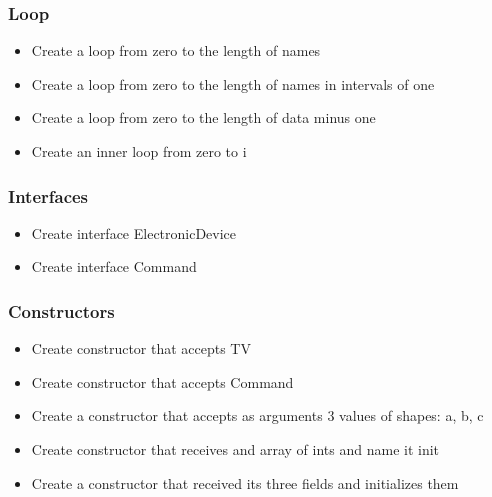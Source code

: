 \subsubsection{Loop}
\begin{itemize}
	\item Create a loop from zero to the length of names
	\item Create a loop from zero to the length of names in intervals of one
	\item Create a loop from zero to the length of data minus one
	\item Create an inner loop from zero to i
\end{itemize}
\subsubsection{Interfaces}
\begin{itemize}
	\item Create interface ElectronicDevice
	\item Create interface Command
\end{itemize}
\subsubsection{Constructors}
\begin{itemize}
	\item Create constructor that accepts TV
	\item Create constructor that accepts Command
	\item Create a constructor that accepts as arguments 3 values of shapes: a, b, c
	\item Create constructor that receives and array of ints and name it init
	\item Create a constructor that received its three fields and initializes them
\end{itemize}
